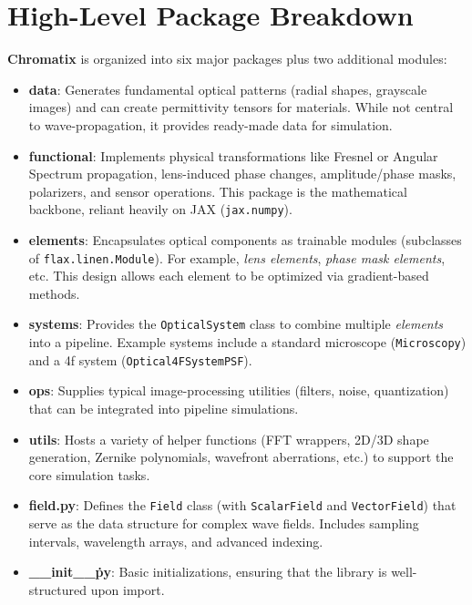 \documentclass[a4paper,12pt]{report}
\begin{document}
\section{High-Level Package Breakdown}
\textbf{Chromatix} is organized into six major packages plus two additional modules:
\begin{itemize}
    \item \textbf{data}: Generates fundamental optical patterns (radial shapes, grayscale images) and can create permittivity tensors for materials. While not central to wave-propagation, it provides ready-made data for simulation.
    \item \textbf{functional}: Implements physical transformations like Fresnel or Angular Spectrum propagation, lens-induced phase changes, amplitude/phase masks, polarizers, and sensor operations. This package is the mathematical backbone, reliant heavily on JAX (\texttt{jax.numpy}).
    \item \textbf{elements}: Encapsulates optical components as trainable modules (subclasses of \texttt{flax.linen.Module}). For example, \textit{lens elements}, \textit{phase mask elements}, etc. This design allows each element to be optimized via gradient-based methods.
    \item \textbf{systems}: Provides the \texttt{OpticalSystem} class to combine multiple \textit{elements} into a pipeline. Example systems include a standard microscope (\texttt{Microscopy}) and a 4f system (\texttt{Optical4FSystemPSF}).
    \item \textbf{ops}: Supplies typical image-processing utilities (filters, noise, quantization) that can be integrated into pipeline simulations.
    \item \textbf{utils}: Hosts a variety of helper functions (FFT wrappers, 2D/3D shape generation, Zernike polynomials, wavefront aberrations, etc.) to support the core simulation tasks.
    \item \textbf{field.py}: Defines the \texttt{Field} class (with \texttt{ScalarField} and \texttt{VectorField}) that serve as the data structure for complex wave fields. Includes sampling intervals, wavelength arrays, and advanced indexing.
    \item \textbf{\_\_init\_\_\.py}: Basic initializations, ensuring that the library is well-structured upon import.
\end{itemize}
\end{document}
